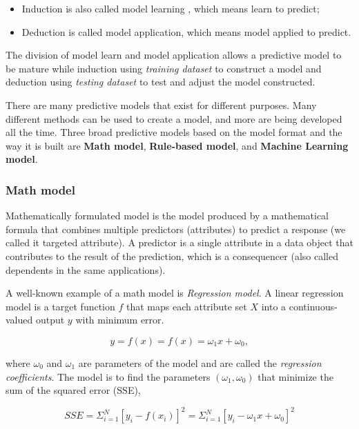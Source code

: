 \documentclass[
]{book}
\begin{document}
\begin{itemize}
\item
  Induction is also called model learning , which means learn to predict;
\item
  Deduction is called model application, which means model applied to predict.
\end{itemize}

The division of model learn and model application allows a predictive model to be mature while induction using \emph{training dataset} to construct a model and deduction using \emph{testing dataset} to test and adjust the model constructed.

There are many predictive models that exist for different purposes. Many different methods can be used to create a model, and more are being developed all the time. Three broad predictive models based on the model format and the way it is built are \textbf{Math model}, \textbf{Rule-based model}, and \textbf{Machine Learning model}.

\hypertarget{math-model}{%
\subsubsection*{Math model}\label{math-model}}


Mathematically formulated model is the model produced by a mathematical formula that combines multiple predictors (attributes) to predict a response (we called it targeted attribute). A predictor is a single attribute in a data object that contributes to the result of the prediction, which is a consequencer (also called dependents in the same applications).

A well-known example of a math model is \emph{Regression model}. A linear regression model is a target function \(f\) that maps each attribute set \(X\) into a continuous-valued output \(y\) with minimum error.

\begin{equation} 
  y = f(x) = f(x)= ω_1 x+ω_0,
  \label{eq:binom}
\end{equation}

where \(ω_0\) and \(ω_1\) are parameters of the model and are called the \emph{regression coefficients}. The model is to find the parameters \((ω_1, ω_0)\) that minimize the sum of the squared error (SSE),

\begin{equation} 
 SSE= \Sigma^{N}_{i=1}[y_i-f(x_i)]^2 = \Sigma^{N}_{i=1}[y_i - ω_1 x + ω_0 ]^2
  \label{eq:sse}
\end{equation}
\end{document}
